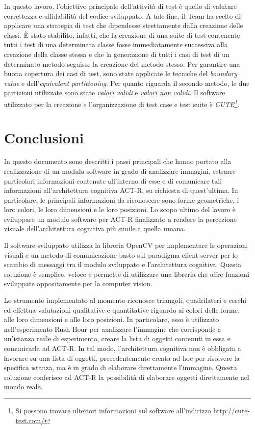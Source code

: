 		In questo lavoro, l'obiettivo principale dell'attività di test è quello di valutare correttezza e affidabilità del codice sviluppato.
		A tale fine, il Team ha scelto di applicare una strategia di test che dipendesse strettamente dalla creazione delle classi.
		È stato stabilito, infatti, che la creazione di una suite di test contenente tutti i test di una determinata classe fosse immediatamente successiva alla creazione della classe stessa e che la generazione di tutti i casi di test di un determinato metodo seguisse la creazione del metodo stesso.
		Per garantire una buona copertura dei casi di test, sono state applicate le tecniche del \emph{boundary value} e dell'\emph{equivalent partitioning}.
		Per quanto riguarda il secondo metodo, le due partizioni utilizzate sono state \emph{valori validi} e \emph{valori non validi}.
		Il software utilizzato per la creazione e l'organizzazione di test case e test suite è \emph{CUTE\footnote{Si possono trovare ulteriori informazioni sul software all'indirizzo \url{http://cute-test.com/}}}.
		

	\section*{Conclusioni}
		In questo documento sono descritti i passi principali che hanno portato alla realizzazione di un modulo software in grado di analizzare immagini, estrarre particolari informazioni contenute all'interno di esse e di comunicare tali informazioni all'architettura cognitiva \mbox{ACT-R}, su richiesta di quest'ultima.
		In particolare, le principali informazioni da riconoscere sono	forme geometriche, i loro colori, le loro dimensioni e le loro posizioni.
		Lo scopo ultimo del lavoro è sviluppare un modulo software per \mbox{ACT-R} finalizzato a rendere la percezione visuale dell'architettura cognitiva più simile a quella umana.

		Il software sviluppato utilizza la libreria \mbox{OpenCV} per implementare le operazioni visuali e un metodo di comunicazione basto sul paradigma client-server per lo scambio di messaggi tra il modulo sviluppato e l'architettura cognitiva. 
		Questa soluzione è semplice, veloce e permette di utilizzare una libreria che offre funzioni sviluppate appositamente per la computer vision.

		Lo strumento implementato al momento riconosce triangoli, quadrilateri e cerchi ed effettua valutazioni qualitative e quantitative riguardo ai colori delle forme, alle loro dimensioni e alle loro posizioni.
		In particolare, esso è utilizzato nell'esperimento Rush Hour per analizzare l'immagine che corrisponde a un'istanza reale di esperimento, creare la lista di oggetti contenuti in essa e comunicarla ad \mbox{ACT-R}.
		In tal modo, l'architettura cognitiva non è obbligata a lavorare su una lista di oggetti, precedentemente creata ad hoc per risolvere la specifica istanza, ma è in grado di elaborare direttamente l'immagine. 
		Questa soluzione conferisce ad \mbox{ACT-R} la possibilità di elaborare oggetti direttamente nel mondo reale.

